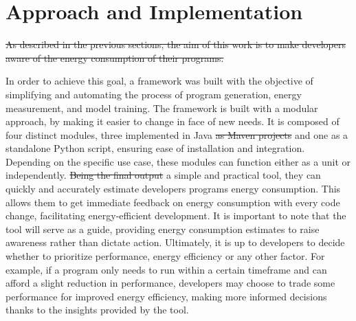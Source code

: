 \chapter{Approach and Implementation}\label{chapter:approach}


\st{As described in the previous sections, the aim of this work is to make developers aware of the energy consumption of their programs.} 



{\color{blue}In order to achieve this goal, a framework was built with the objective of simplifying and automating the process of program generation, energy measurement, and model training. The framework is built with a modular approach, by making it easier to change in face of new needs. It is composed of four distinct modules, three implemented in Java \st{as Maven projects} and one as a standalone Python script, ensuring ease of installation and integration. Depending on the specific use case, these modules can function either as a unit or independently.  \st{Being the final output} a simple and practical tool, they can quickly and accurately estimate developers programs energy consumption. This allows them to get immediate feedback on energy consumption with every code change, facilitating energy-efficient development.} 
It is important to note that the tool will serve as a guide, providing energy consumption estimates to raise awareness rather than dictate action. Ultimately, it is up to developers to decide whether to prioritize performance, energy efficiency or any other factor. For example, if a program only needs to run within a certain timeframe and can afford a slight reduction in performance, developers may choose to trade some performance for improved energy efficiency, making more informed decisions thanks to the insights provided by the tool.


